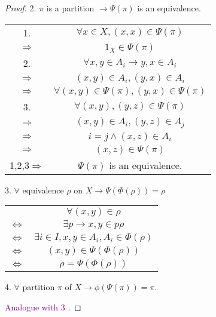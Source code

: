 \begin{Prop}
\begin{proof}
        2. $\pi$ is a partition $\to \Psi(\pi)$ is an equivalence.

        \begin{center}
            \begin{tabular}{c c}
                1. & $\forall x \in X, (x, x) \in \Psi(\pi)$ \\
                $\Rightarrow$ & $1_X \in \Psi(\pi)$ \\
                2. & $\forall x, y\in A_i \rightarrow y,x\in A_i$   \\
                $\Rightarrow$ & $(x,y)\in A_i, (y,x)\in A_i$    \\
                $\Rightarrow$ & $\forall (x,y)\in \Psi(\pi), (y,x)\in \Psi(\pi)$    \\
                3. & $\forall (x,y), (y,z) \in \Psi(\pi)$   \\
                $\Rightarrow$ & $(x,y)\in A_i, (y,z)\in A_j$   \\
                $\Rightarrow$ & $i = j \wedge (x,z) \in A_i$    \\
                $\Rightarrow$ & $(x,z) \in \Psi(\pi)$   \\
                1,2,3$\Rightarrow$ & $\Psi(\pi)$ is an equivalence.
            \end{tabular}
        \end{center}

        3. $\forall$ equivalence $\rho$ on $X \to \Psi(\Phi(\rho)) = \rho$

        \begin{center}
            \begin{tabular}{c c}
                & $\forall (x,y)\in \rho$   \\
                $\Leftrightarrow$ & $\exists p \rightarrow x,y\in p\rho$   \\
                $\Leftrightarrow$ & $\exists i\in I, x,y \in A_i, A_i \in \Phi(\rho)$    \\
                $\Leftrightarrow$ & $(x,y)\in \Psi(\Phi(\rho))$ \\
                $\Leftrightarrow$ & $\rho = \Psi(\Phi(\rho))$   \\
            \end{tabular}
        \end{center}

        4. $\forall$ partition $\pi$ of $X \to \phi(\Psi(\pi)) = \pi$.

        \textcolor{purple}{Analogue with 3 }.
    \end{proof}
    
\end{Prop}

